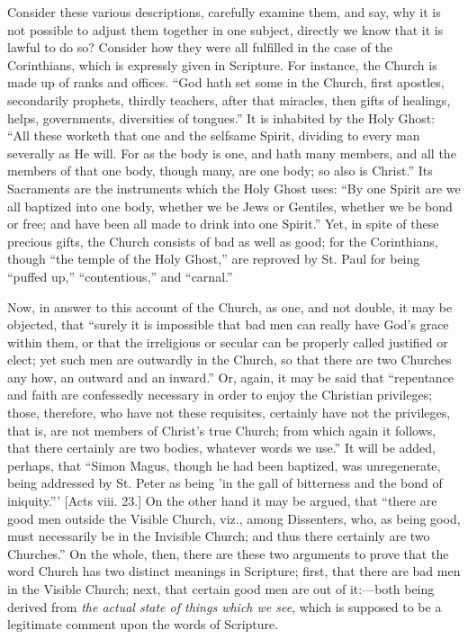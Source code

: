 Consider these various descriptions, carefully examine them, and
say, why it is not possible to adjust them together in one subject,
directly we know that it is lawful to do so? Consider how they were
all fulfilled in the case of the Corinthians, which is expressly given
in Scripture. For instance, the Church is made up of ranks and
offices. ``God hath set some in the Church, first apostles,
secondarily prophets, thirdly teachers, after that miracles, then
gifts of healings, helps, governments, diversities of tongues.''
It is inhabited by the Holy Ghost: ``All these worketh that one
and the selfsame Spirit, dividing to every man severally as He will.
For as the body is one, and hath many members, and all the members of
that one body, though many, are one body; so also is Christ.'' Its
Sacraments are the instruments which the Holy Ghost uses: ``By one
Spirit are we all baptized into one body, whether we be Jews or
Gentiles, whether we be bond or free; and have been all made to drink
into one Spirit.'' Yet, in spite of these precious gifts, the
Church consists of bad as well as good; for the Corinthians, though
``the temple of the Holy Ghost,'' are reproved by St. Paul for
being ``puffed up,'' ``contentious,'' and
``carnal.''

Now, in answer to this account of the Church, as one, and not
double, it may be objected, that ``surely it is impossible that
bad men can really have God's grace within them, or that the
irreligious or secular can be properly called justified or elect; yet
such men are outwardly in the Church, so that there are two Churches
any how, an outward and an inward.'' Or, again, it may be said
that ``repentance and faith are confessedly necessary in order to
enjoy the Christian privileges; those, therefore, who have not these
requisites, certainly have not the privileges, that is, are not
members of Christ's true Church; from which again it follows, that
there certainly are two bodies, whatever words we use.'' It will
be added, perhaps, that ``Simon Magus, though he had been
baptized, was unregenerate, being addressed by St. Peter as being 'in
the gall of bitterness and the bond of iniquity.''' [Acts viii.
23.] On the other hand it may be argued, that ``there are
good men outside the Visible Church, viz., among Dissenters, who, as
being good, must necessarily be in the Invisible Church; and thus
there certainly are two Churches.'' On the whole, then, there are
these two arguments to prove that the word Church has two distinct
meanings in Scripture; first, that there are bad men in the Visible
Church; next, that certain good men are out of it:—both being
derived from \emph{the actual state of things which we see}, which is
supposed to be a legitimate comment upon the words of Scripture.

